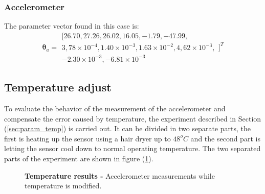 \documentclass[conference]{IEEEtran}
\newcommand{\refp}[1]{(\ref{#1})}
\begin{document}
\subsubsection{Accelerometer}
The parameter vector found in this case is:
\begin{equation}
\boldsymbol{\theta}_a = \begin{array}{c}
[26.70, 27.26, 26.02, 16.05, -1.79, -47.99,\\
 3,78\times 10^{-4}, 1.40\times 10^{-3}, 1.63 \times 10^{-2},  4,62 \times 10^{-3},\\ -2.30\times 10^{-3}, -6.81 \times 10^{-3}
\end{array}]^T
\end{equation}



\subsection{Temperature adjust}

To evaluate the behavior of the measurement of the accelerometer and compensate the error caused by temperature, the experiment described in Section \refp{sec:param_temp} is carried out. It can be divided in two separate parts, the first is heating up the sensor using a hair dryer up to $48^oC$ and the second part is letting the sensor cool down to normal operating temperature. The two separated parts of the experiment are shown in figure \refp{fig:temp_res}.

\begin{figure}[h!]
	\caption{\textbf{Temperature results -} Accelerometer measurements while temperature is modified.}
	\label{fig:temp_res}
\end{figure}
\end{document}
